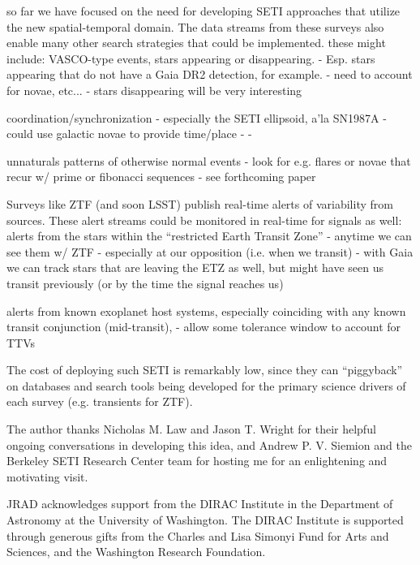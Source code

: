 \documentclass[twocolumn]{aastex62}
\begin{document}
so far we have focused on the need for developing SETI approaches that utilize the new spatial-temporal domain. The data streams from these surveys also enable many other search strategies that could be implemented. these might include:
VASCO-type events, stars appearing or disappearing. \citep{villarroel2016}
	- Esp. stars appearing that do not have a Gaia DR2 detection, for example.
	- need to account for novae, etc...
	- stars disappearing will be very interesting

coordination/synchronization \citep{makovetskii1977,shostak2004}
        - especially the SETI ellipsoid, a'la SN1987A \citep{lemarchand1994}
        - could use galactic novae to provide time/place
        - %
        - %

unnaturals patterns of otherwise normal events
	- look for e.g. flares or novae that recur w/ prime or fibonacci sequences
	- see forthcoming paper




Surveys like ZTF (and soon LSST) publish real-time alerts of variability from sources. These alert streams could be monitored in real-time for signals as well:
alerts from the stars within the ``restricted Earth Transit Zone'' \citep{heller2016}
	- anytime we can see them w/ ZTF
	- especially at our opposition (i.e. when we transit)
	- with Gaia we can track stars that are leaving the ETZ as well, but might 
	have seen us transit previously (or by the time the signal reaches us)

alerts from known exoplanet host systems, especially coinciding with any known transit conjunction (mid-transit), 
	- allow some tolerance window to account for TTVs



The cost of deploying such SETI is remarkably low, since they can ``piggyback'' on databases and search tools being developed for the primary science drivers of each survey (e.g. transients for ZTF).




\acknowledgments

The author thanks Nicholas M. Law and Jason T. Wright for their helpful ongoing conversations in developing this idea, and Andrew P. V. Siemion and the Berkeley SETI Research Center team for hosting me for an enlightening and motivating visit.

JRAD acknowledges support from the DIRAC Institute in the Department of Astronomy at the University of Washington. The DIRAC Institute is supported through generous gifts from the Charles and Lisa Simonyi Fund for Arts and Sciences, and the Washington Research Foundation.


\end{document}
